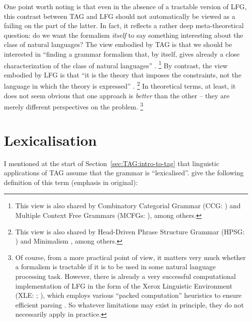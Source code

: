 \documentclass[output=paper,hidelinks]{langscibook}
\begin{document}
One point worth noting is that even in the absence of a tractable version of
LFG, this contrast between TAG and LFG should not automatically be viewed as a
failing on the part of the latter. In fact, it reflects a rather deep
meta-theoretical question: do we want the formalism \emph{itself} to say
something interesting about the class of natural languages? The view embodied by
TAG is that we should be interested in ``finding a grammar
formalism that, by itself, gives already a close characterization of the class
of natural languages'' \citep[7]{Kallmeyer2010}.%
%
\footnote{This view is also shared by Combinatory Categorial Grammar (CCG: \citealt{steedman2000ccg}) and Multiple Context Free Grammars (MCFGs: \citealt{SekiEtAl1991}), among others.}
%
By contrast, the view embodied
by LFG is that ``it is the theory that imposes the
constraints, not the language in which the theory is expressed''
\citep[9]{poll:97:nature}.%
%
\footnote{This view is also shared by Head-Driven Phrase Structure Grammar (HPSG: \citealt{pollard1994head-driven}) and Minimalism \citep{chomsky1995the-minimalist}, among others.}
%
In theoretical terms, at least, it does not seem
obvious that one approach is \emph{better} than the other -- they are merely
different perspectives on the problem.%
%
\footnote{Of course, from a more practical point of view, it matters very much
  whether a formalism is tractable if it is to be used in some natural language
  processing task. However, there is already a very successful computational
  implementation of LFG in the form of the Xerox Linguistic Environment (XLE:
  \citealp{kaplannewman97}; \citealp{xledoc}), which employs various ``packed
  computation'' \citep{lev:packed-computation} heuristics to ensure efficient
  parsing \citep{maxwellkaplan89,maxwellkaplan93,maxwellkaplan96}. So whatever
  limitations may exist in principle, they do not necessarily apply in
  practice.}
%


\section{Lexicalisation}\label{sec:TAG:lexicalisation}

I mentioned at the start of Section~\ref{sec:TAG:intro-to-tag} that linguistic
applications of TAG assume that the grammar is ``lexicalised''.
\citet[7]{abeille-rambow2000} give the following definition of this term
(emphasis in original):
\end{document}
